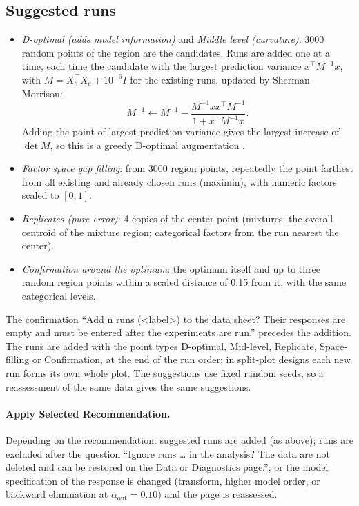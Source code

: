 \subsection{Suggested runs}
\label{sec:ch04-suggest}
\begin{itemize}
\item \emph{D-optimal (adds model information)} and \emph{Middle level (curvature)}: 3000 random points of the region
are the candidates. Runs are added one at a time, each time the candidate with the largest prediction variance
$x^\top M^{-1} x$, with $M = X_e^\top X_e + 10^{-6} I$ for the existing runs, updated by Sherman--Morrison:
\begin{equation}
M^{-1} \leftarrow M^{-1} - \frac{M^{-1} x x^\top M^{-1}}{1 + x^\top M^{-1} x}.
\label{eq:ch04-sm}
\end{equation}
Adding the point of largest prediction variance gives the largest increase of $\det M$, so this is a greedy
D-optimal augmentation \citep{goos2011}.
\item \emph{Factor space gap filling}: from 3000 region points, repeatedly the point farthest from all existing and
already chosen runs (maximin), with numeric factors scaled to $[0,1]$.
\item \emph{Replicates (pure error)}: 4 copies of the center point (mixtures: the overall centroid of the mixture
region; categorical factors from the run nearest the center).
\item \emph{Confirmation around the optimum}: the optimum itself and up to three random region points within a
scaled distance of 0.15 from it, with the same categorical levels.
\end{itemize}
The confirmation ``Add n runs (\textless label\textgreater) to the data sheet? Their responses are empty and must be
entered after the experiments are run.'' precedes the addition. The runs are added with the point types D-optimal,
Mid-level, Replicate, Space-filling or Confirmation, at the end of the run order; in split-plot designs each new run
forms its own whole plot. The suggestions use fixed random seeds, so a reassessment of the same data gives the same
suggestions.

\paragraph{Apply Selected Recommendation.} Depending on the recommendation: suggested runs are added (as above); runs
are excluded after the question ``Ignore runs \dots{} in the analysis? The data are not deleted and can be restored on
the Data or Diagnostics page.''; or the model specification of the response is changed (transform, higher model
order, or backward elimination at $\alpha_{\text{out}} = 0.10$) and the page is reassessed.

